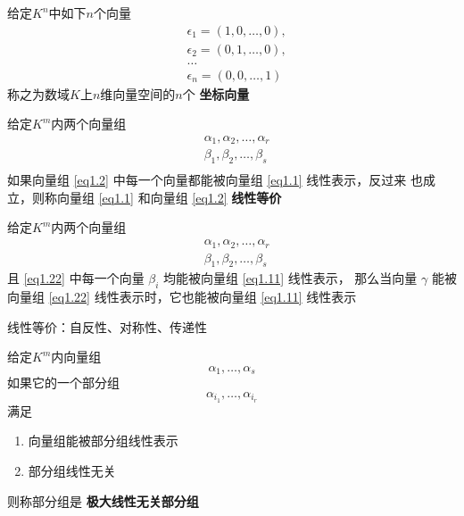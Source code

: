 \documentclass[11pt]{article}
\begin{document}
给定\(K^n\)中如下\(n\)个向量
\begin{align*}
&\epsilon_1=(1,0,\dots,0),\\
&\epsilon_2=(0,1,\dots,0),\\
&\dots\\
&\epsilon_n=(0,0,\dots,1)
\end{align*}
称之为数域\(K\)上\(n\)维向量空间的\(n\)个 \textbf{坐标向量}

\begin{definition}[]
给定\(K^m\)内两个向量组
\begin{align}
&   \alpha_1,\alpha_2,\dots,\alpha_r\label{eq1.1}\\
&\beta_1,\beta_2,\dots,\beta_s\label{eq1.2}\\
\end{align}
如果向量组 \eqref{eq1.2} 中每一个向量都能被向量组 \eqref{eq1.1} 线性表示，反过来
也成立，则称向量组 \eqref{eq1.1} 和向量组 \eqref{eq1.2} \textbf{线性等价}
\end{definition}

\begin{proposition}[]


给定\(K^m\)内两个向量组
\begin{align}
&\alpha_1,\alpha_2,\dots,\alpha_r\label{eq1.11}\\
&\beta_1,\beta_2,\dots,\beta_s\label{eq1.22}
\end{align}
且 \eqref{eq1.22} 中每一个向量 \(\beta_i\) 均能被向量组 \eqref{eq1.11} 线性表示，
那么当向量 \(\gamma\) 能被向量组 \eqref{eq1.22} 线性表示时，它也能被向量组 \eqref{eq1.11}
线性表示
\end{proposition}

线性等价：自反性、对称性、传递性

\begin{definition}[]
给定\(K^m\)内向量组
\begin{equation*}
\alpha_1,\dots,\alpha_s
\end{equation*}
如果它的一个部分组
\begin{equation*}
\alpha_{i_1},\dots,\alpha_{i_r}
\end{equation*}
满足
\begin{enumerate}
\item 向量组能被部分组线性表示
\item 部分组线性无关
\end{enumerate}


则称部分组是 \textbf{极大线性无关部分组}
\end{definition}
\end{document}
